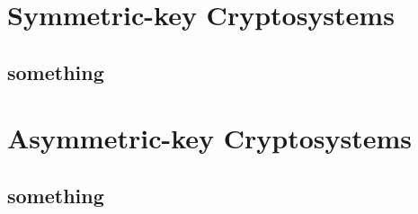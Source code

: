 \documentclass{report}
\begin{document}
	\section{Symmetric-key Cryptosystems}

	\subsection{something}

	\section{Asymmetric-key Cryptosystems}

	\subsection{something}
\end{document}
